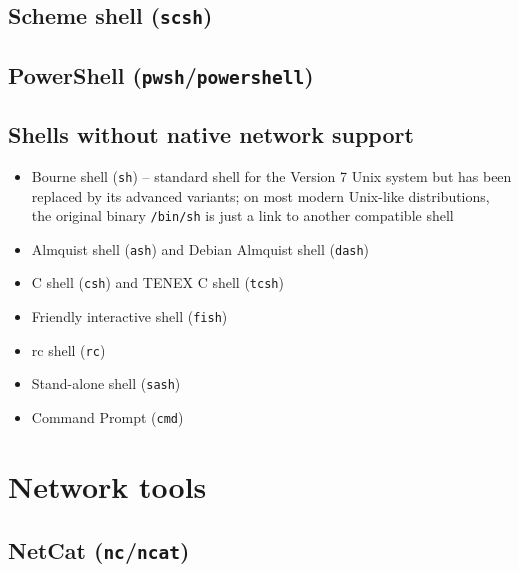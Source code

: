 



\subsection{Scheme shell (\texttt{scsh})}


\subsection{PowerShell (\texttt{pwsh}/\texttt{powershell})}





\subsection{Shells without native network support}

\begin{itemize}
\item Bourne shell (\texttt{sh}) -- standard shell for the Version 7 Unix system but has been replaced by its advanced variants; on most modern Unix-like distributions, the original binary \texttt{/bin/sh} is just a link to another compatible shell
\item Almquist shell (\texttt{ash}) and Debian Almquist shell (\texttt{dash})
\item C shell (\texttt{csh}) and TENEX C shell (\texttt{tcsh})
\item Friendly interactive shell (\texttt{fish})
\item rc shell (\texttt{rc})
\item Stand-alone shell (\texttt{sash})
\item Command Prompt (\texttt{cmd})
\end{itemize}


\section{Network tools}

\subsection{NetCat (\texttt{nc}/\texttt{ncat})}

